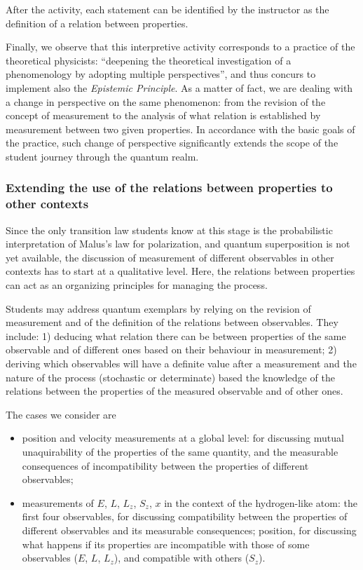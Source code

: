\documentclass[twocolumn,secnumarabic,amssymb, nobibnotes, aps, prd, nofootinbib]{revtex4-2}
\begin{document}
After the activity, each statement can be identified by the instructor as the definition of a relation between properties.

Finally, we observe that this interpretive activity corresponds to a practice of the theoretical physicists: ``deepening the theoretical investigation of a phenomenology by adopting multiple perspectives'', and thus concurs to implement also the \emph{Epistemic Principle}. As a matter of fact, we are dealing with a change in perspective on the same phenomenon: from the revision of the concept of measurement to the analysis of what relation is established by measurement between two given properties. In accordance with the basic goals of the practice, such change of perspective significantly extends the scope of the student journey through the quantum realm.

\subsubsection{Extending the use of the relations between properties to other contexts} \label{Sec:3.3.2}
Since the only transition law students know at this stage is the probabilistic interpretation of Malus's law for polarization, and quantum superposition is not yet available, the discussion of measurement of different observables in other contexts has to start at a qualitative level. Here, the relations between properties can act as an organizing principles for managing the process.

Students may address quantum exemplars by relying on the revision of measurement and of the definition of the relations between observables. They include: 1) deducing what relation there can be between properties of the same observable and of different ones based on their behaviour in measurement; 2) deriving which observables will have a definite value after a measurement and the nature of the process (stochastic or determinate) based the knowledge of the relations between the properties of the measured observable and of other ones.

The cases we consider are
\begin{itemize}
    \item position and velocity measurements at a global level: for discussing mutual unaquirability of the properties of the same quantity, and the measurable consequences of incompatibility between the properties of different observables;
    \item measurements of $E$, $L$, $L_z$, $S_z$, $x$ in the context of the hydrogen-like atom: the first four observables, for discussing compatibility between the properties of different observables and its measurable consequences; position, for discussing what happens if its properties are incompatible with those of some observables ($E$, $L$, $L_z$), and compatible with others ($S_z$).
\end{itemize}
\end{document}
